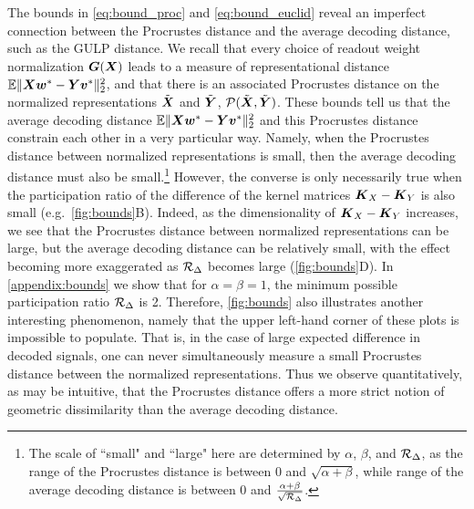 The bounds in \cref{eq:bound_proc} and \cref{eq:bound_euclid} reveal an imperfect connection between the Procrustes distance and the average decoding distance, such as the GULP distance.  
We recall that every choice of readout weight normalization $\boldsymbol{G}(\boldsymbol{X})$ leads to a measure of representational distance $\mathbb{E} \Vert \boldsymbol{X} \boldsymbol{w}^* - \boldsymbol{Y} \boldsymbol{v}^* \Vert^2_2$, and that there is an associated Procrustes distance on the normalized representations $\tilde{\boldsymbol{X}}$ and $\tilde{\boldsymbol{Y}}$, $\mathcal{P} (\tilde{\boldsymbol{X}}, \tilde{\boldsymbol{Y}})$.  
These bounds tell us that the average decoding distance $\mathbb{E} \Vert \boldsymbol{X} \boldsymbol{w}^* - \boldsymbol{Y} \boldsymbol{v}^* \Vert^2_2$ and this Procrustes distance constrain each other in a very particular way.  
Namely, when the Procrustes distance between normalized representations is small, then the average decoding distance must also be small.\footnote{The scale of ``small" and ``large" here are determined by $\alpha$, $\beta$, and $\mathcal{R}_\Delta$, as the range of the Procrustes distance is between $0$ and $ \sqrt{\alpha + \beta}$, while range of the average decoding distance is between 0 and $\frac{\alpha + \beta}{\sqrt{\mathcal{R}_\Delta}}$. }  
However, the converse is only necessarily true when the participation ratio of the difference of the kernel matrices $\boldsymbol{K}_X - \boldsymbol{K}_Y$ is also small (e.g.\ \cref{fig:bounds}B).  
Indeed, as the dimensionality of $\boldsymbol{K}_X - \boldsymbol{K}_Y$ increases, we see that the Procrustes distance between normalized representations can be large, but the average decoding distance can be relatively small, with the effect becoming more exaggerated as $\mathcal{R}_\Delta$ becomes large (\cref{fig:bounds}D).  
In \cref{appendix:bounds} we show that for $\alpha = \beta = 1$, the minimum possible participation ratio $\mathcal{R}_\Delta$ is 2.  
Therefore, \cref{fig:bounds} also illustrates another interesting phenomenon, namely that the upper left-hand corner of these plots is impossible to populate. 
That is, in the case of large expected difference in decoded signals, one can never simultaneously measure a small Procrustes distance between the normalized representations.
Thus we observe quantitatively, as may be intuitive, that the Procrustes distance offers a more strict notion of geometric dissimilarity than the average decoding distance.  



